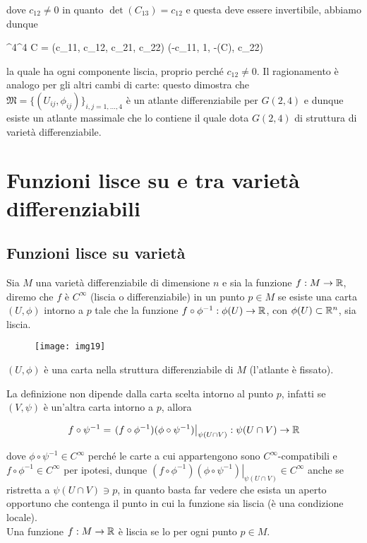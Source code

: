dove $ c_{12} \neq 0 $ in quanto $ \det(C_{13}) = c_{12} $ e questa deve essere invertibile, abbiamo dunque

%
	{\R^{4}}{\R^{4}}%
	{C = (c_{11}, c_{12}, c_{21}, c_{22})}{ (-c_{11}, 1, -\det(C), c_{22})}

la quale ha ogni componente liscia, proprio perché $ c_{12} \neq 0 $. Il ragionamento è analogo per gli altri cambi di carte: questo dimostra che $ \mathfrak{M} = \{(U_{ij},\phi_{ij})\}_{i,j=1,\dots,4} $ è un atlante differenziabile per $ G(2,4) $ e dunque esiste un atlante massimale che lo contiene il quale dota $ G(2,4) $ di struttura di varietà differenziabile.

\section{Funzioni lisce su e tra varietà differenziabili}

\subsection{Funzioni lisce su varietà}

Sia $ M $ una varietà differenziabile di dimensione $ n $ e sia la funzione $ f : M \to \mathbb{R} $, diremo che $ f $ è $ C^{\infty} $ (liscia o differenziabile) in un punto $ p \in M $ se esiste una carta $ (U,\phi) $ intorno a $ p $ tale che la funzione $ f \circ \phi^{-1} : \phi(U) \to \mathbb{R} $, con $ \phi(U) \subset \mathbb{R}^{n} $, sia liscia.

\begin{figure}[H]
	\centering
	\texttt{[image: img19]}
\end{figure}

\begin{remark}
	$ (U,\phi) $ è una carta nella struttura differenziabile di $ M $ (l'atlante è fissato).
\end{remark}

La definizione non dipende dalla carta scelta intorno al punto $ p $, infatti se $ (V,\psi) $ è un'altra carta intorno a $ p $, allora

\begin{equation}
	f \circ \psi^{-1} = \left. (f \circ \phi^{-1})(\phi \circ \psi^{-1}) \right|_{\psi(U \cap V)} : \psi(U \cap V) \to \mathbb{R}
\end{equation}

dove $ \phi \circ \psi^{-1} \in C^{\infty} $ perché le carte a cui appartengono sono $ C^{\infty} $-compatibili e $ f \circ \phi^{-1} \in C^{\infty} $ per ipotesi, dunque $ \left. (f \circ \phi^{-1})(\phi \circ \psi^{-1}) \right|_{\psi(U \cap V)} \in C^{\infty} $ anche se ristretta a $ \psi(U \cap V) \ni p $, in quanto basta far vedere che esista un aperto opportuno che contenga il punto in cui la funzione sia liscia (è una condizione locale).\\
Una funzione $ f : M \to \mathbb{R} $ è liscia se lo per ogni punto $ p \in M $.

